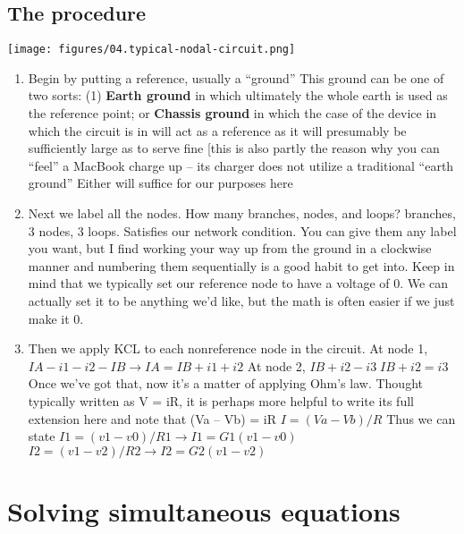 \documentclass[11pt]{book}
\begin{document}
\subsection{The procedure}

\begin{center}
	\texttt{[image: figures/04.typical-nodal-circuit.png]}
\end{center}

\begin{enumerate}
	\item Begin by putting a reference, usually a ``ground''
	\subitem This ground can be one of two sorts: (1) \textbf{Earth ground} in which ultimately the whole earth is used as the reference point; or \textbf{Chassis ground} in which the case of the device in which the circuit is in will act as a reference as it will presumably be sufficiently large as to serve fine [this is also partly the reason why you can ``feel'' a MacBook charge up – its charger does not utilize a traditional ``earth ground''
	\subitem Either will suffice for our purposes here
	\item Next we label all the nodes.
	\subitem How many branches, nodes, and loops?
	 branches, 3 nodes, 3 loops. Satisfies our network condition. 
	\subitem You can give them any label you want, but I find working your way up from the ground in a clockwise manner and numbering them sequentially is a good habit to get into.
	\subitem Keep in mind that we typically set our reference node to have a voltage of 0. We can actually set it to be anything we’d like, but the math is often easier if we just make it 0.
	\item Then we apply KCL to each nonreference node in the circuit.
	\subitem At node 1, $IA - i1 - i2 - IB \rightarrow IA = IB + i1 + i2$
	\subitem At node 2, $IB + i2 - i3  IB + i2 = i3$
	\subitem Once we’ve got that, now it’s a matter of applying Ohm’s law. Thought typically written as V = iR, it is perhaps more helpful to write its full extension here and note that (Va – Vb) = iR
	\subsubitem $I = (Va - Vb)/R$
	\subitem Thus we can state
	\subsubitem $I1 = (v1 - v0)/R1 	\rightarrow I1 = G1(v1 - v0)$
	\subsubitem $I2 = (v1 - v2)/R2 \rightarrow I2 = G2(v1 - v2)$

\end{enumerate}





\section{Solving simultaneous equations}
\end{document}
